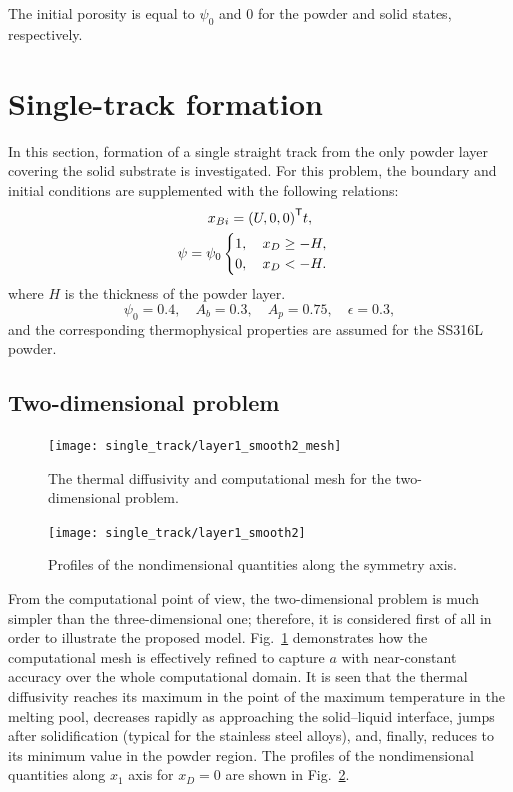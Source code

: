 \documentclass{article}
\newcommand{\transpose}[1]{#1^\mathsf{T}}
\begin{document}
The initial porosity is equal to \(\psi_0\) and \(0\) for the powder and solid states, respectively.

\section{Single-track formation}

In this section, formation of a single straight track from the only powder layer covering the solid substrate is investigated.
For this problem, the boundary and initial conditions are supplemented with the following relations:
\begin{gather}
    x_{Bi} = \transpose{\qty(U,0,0)}t, \label{eq:single:bc} \\
    \psi = \psi_0\begin{cases}
        1, \quad x_D \geq -H, \\
        0, \quad x_D < -H.
    \end{cases}\label{eq:single:ic}
\end{gather}
where \(H\) is the thickness of the powder layer.
\begin{equation}\label{eq:single:params}
    \psi_0 = 0.4, \quad A_b = 0.3, \quad A_p = 0.75, \quad \epsilon = 0.3,
\end{equation}
and the corresponding thermophysical properties are assumed for the SS316L powder.

\subsection{Two-dimensional problem}

\begin{figure}
    \centering
    \texttt{[image: single\_track/layer1\_smooth2\_mesh]}
    \caption{
        The thermal diffusivity and computational mesh for the two-dimensional problem.
    }\label{fig:2d:mesh}
\end{figure}

\begin{figure}
    \centering
    \texttt{[image: single\_track/layer1\_smooth2]}
    \caption{
        Profiles of the nondimensional quantities along the symmetry axis.
    }\label{fig:2d:profiles}
\end{figure}

From the computational point of view, the two-dimensional problem is much simpler than the three-dimensional one;
therefore, it is considered first of all in order to illustrate the proposed model.
Fig.~\ref{fig:2d:mesh} demonstrates how the computational mesh is effectively refined
to capture \(a\) with near-constant accuracy over the whole computational domain.
It is seen that the thermal diffusivity reaches its maximum in the point of the maximum temperature in the melting pool,
decreases rapidly as approaching the solid--liquid interface, jumps after solidification (typical for the stainless steel alloys),
and, finally, reduces to its minimum value in the powder region.
The profiles of the nondimensional quantities along \(x_1\) axis for \(x_D=0\) are shown in Fig.~\ref{fig:2d:profiles}.
\end{document}
